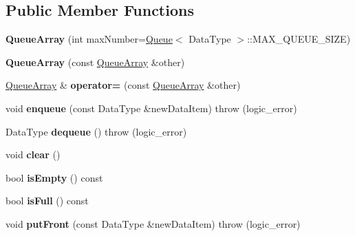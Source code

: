 \subsection*{Public Member Functions}
\begin{DoxyCompactItemize}
\item 
\hypertarget{class_queue_array_a112114659f8c2590872426a2dee8e6cc}{{\bfseries Queue\+Array} (int max\+Number=\hyperlink{class_queue}{Queue}$<$ Data\+Type $>$\+::M\+A\+X\+\_\+\+Q\+U\+E\+U\+E\+\_\+\+S\+I\+Z\+E)}\label{class_queue_array_a112114659f8c2590872426a2dee8e6cc}

\item 
\hypertarget{class_queue_array_a08df206def55e930c9c561ee8bc93422}{{\bfseries Queue\+Array} (const \hyperlink{class_queue_array}{Queue\+Array} \&other)}\label{class_queue_array_a08df206def55e930c9c561ee8bc93422}

\item 
\hypertarget{class_queue_array_adaad55e5da06583cc786af90937a94c1}{\hyperlink{class_queue_array}{Queue\+Array} \& {\bfseries operator=} (const \hyperlink{class_queue_array}{Queue\+Array} \&other)}\label{class_queue_array_adaad55e5da06583cc786af90937a94c1}

\item 
\hypertarget{class_queue_array_a15e0632c580858c396d3aac1265fecd7}{void {\bfseries enqueue} (const Data\+Type \&new\+Data\+Item)  throw (logic\+\_\+error)}\label{class_queue_array_a15e0632c580858c396d3aac1265fecd7}

\item 
\hypertarget{class_queue_array_a34d386d2323aa80b7b441d4436153a89}{Data\+Type {\bfseries dequeue} ()  throw (logic\+\_\+error)}\label{class_queue_array_a34d386d2323aa80b7b441d4436153a89}

\item 
\hypertarget{class_queue_array_a154afbf4084cb08e3a134f2f6a33df6c}{void {\bfseries clear} ()}\label{class_queue_array_a154afbf4084cb08e3a134f2f6a33df6c}

\item 
\hypertarget{class_queue_array_ae1298c7e16e1053b628a019e71db4320}{bool {\bfseries is\+Empty} () const }\label{class_queue_array_ae1298c7e16e1053b628a019e71db4320}

\item 
\hypertarget{class_queue_array_a7233d591dd81e9e3d3f6e4ad5631c81c}{bool {\bfseries is\+Full} () const }\label{class_queue_array_a7233d591dd81e9e3d3f6e4ad5631c81c}

\item 
\hypertarget{class_queue_array_add18fcb931a244d56040a1f0a0c24a8f}{void {\bfseries put\+Front} (const Data\+Type \&new\+Data\+Item)  throw (logic\+\_\+error)}\label{class_queue_array_add18fcb931a244d56040a1f0a0c24a8f}


\end{DoxyCompactItemize}
